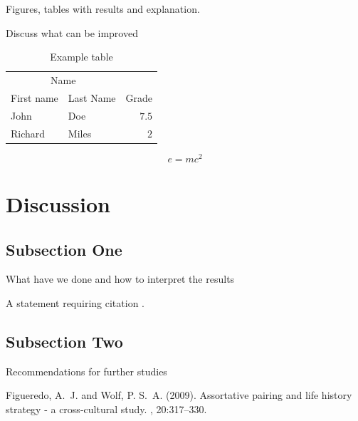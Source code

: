\documentclass[twoside,twocolumn]{article}
\begin{document}
	Figures, tables with results and explanation.
	
	Discuss what can be improved
		
	\begin{table}
		\caption{Example table}
		\centering
		\begin{tabular}{llr}
			\toprule
			\multicolumn{2}{c}{Name} \\
			\cmidrule(r){1-2}
			First name & Last Name & Grade \\
			\midrule
			John & Doe & $7.5$ \\
			Richard & Miles & $2$ \\
			\bottomrule
		\end{tabular}
	\end{table}
	
	\blindtext %
	
	\begin{equation}
		\label{eq:emc}
		e = mc^2
	\end{equation}
	
	\blindtext %
	
	
	\section{Discussion}
	
	\subsection{Subsection One}
	
	What have we done and how to interpret the results
	
	A statement requiring citation \cite{Figueredo:2009dg}.
	\blindtext %
	
	\subsection{Subsection Two}
	
	Recommendations for further studies
	
	\blindtext %
	
	
	\begin{thebibliography}{99} %
		
		Figueredo, A.~J. and Wolf, P. S.~A. (2009).
		\newblock Assortative pairing and life history strategy - a cross-cultural
		study.
		, 20:317--330.
		
	\end{thebibliography}
	
	
\end{document}
